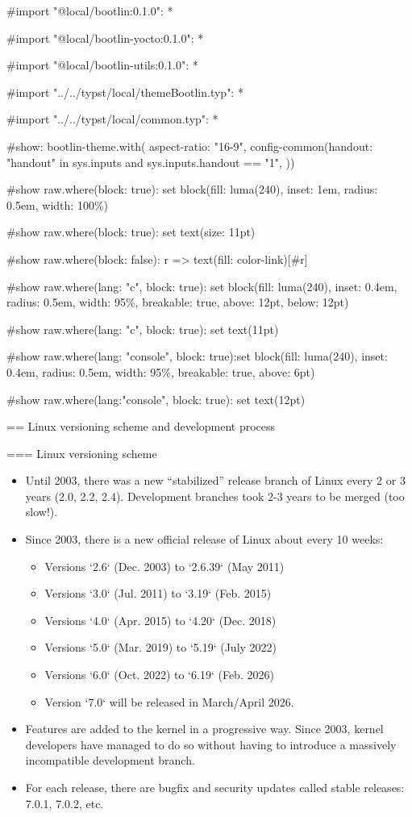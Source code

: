 #import "@local/bootlin:0.1.0": *

#import "@local/bootlin-yocto:0.1.0": *

#import "@local/bootlin-utils:0.1.0": *

#import "../../typst/local/themeBootlin.typ": *

#import "../../typst/local/common.typ": *

#show: bootlin-theme.with( aspect-ratio: "16-9", config-common(handout: "handout" in sys.inputs and sys.inputs.handout == "1", ))

#show raw.where(block: true): set block(fill: luma(240), inset: 1em, radius: 0.5em, width: 100\%)

#show raw.where(block: true): set text(size: 11pt)

#show raw.where(block: false): r => text(fill: color-link)[#r]

#show raw.where(lang: "c", block: true): set block(fill: luma(240), inset: 0.4em, radius: 0.5em, width: 95\%, breakable: true, above: 12pt, below: 12pt)

#show raw.where(lang: "c", block: true): set text(11pt)

#show raw.where(lang: "console", block: true):set block(fill: luma(240), inset: 0.4em, radius: 0.5em, width: 95\%, breakable: true, above: 6pt)

#show raw.where(lang:"console", block: true): set text(12pt)

 == Linux versioning scheme and development process

=== Linux versioning scheme
  \begin{itemize}
  \item Until 2003, there was a new ``stabilized'' release branch of Linux every
        2 or 3 years (2.0, 2.2, 2.4). Development branches took 2-3
        years to be merged (too slow!).
  \item Since 2003, there is a new official release of Linux about every
	10 weeks:
  \begin{itemize}
	\item Versions `2.6` (Dec. 2003) to `2.6.39` (May 2011)
	\item Versions `3.0` (Jul. 2011) to `3.19` (Feb. 2015)
	\item Versions `4.0` (Apr. 2015) to `4.20` (Dec. 2018)
	\item Versions `5.0` (Mar. 2019) to `5.19` (July 2022)
	\item Versions `6.0` (Oct. 2022) to `6.19` (Feb. 2026)
	\item Version `7.0` will be released in March/April 2026.
  \end{itemize}
  \item Features are added to the kernel in a progressive way. Since
        2003, kernel developers have managed to do so without having
        to introduce a massively incompatible development branch.
  \item For each release, there are bugfix and security updates called
    stable releases: 7.0.1, 7.0.2, etc.
  \end{itemize}


